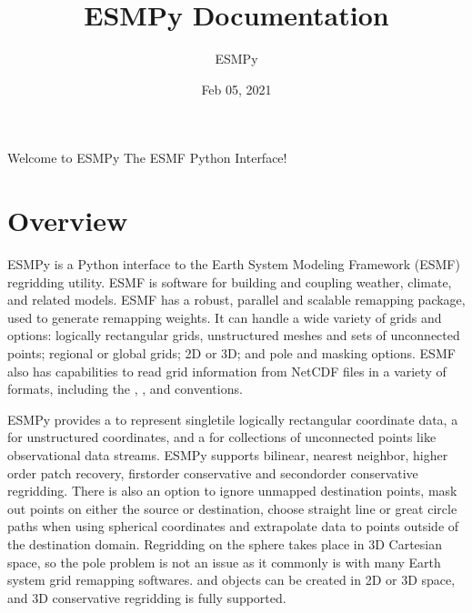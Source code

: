 \documentclass[letterpaper,10pt,english]{sphinxmanual}
\title{ESMPy Documentation}
\date{Feb 05, 2021}
\author{ESMPy}
\begin{document}
\pagestyle{empty}
\sphinxmaketitle
\pagestyle{plain}
\sphinxtableofcontents
\pagestyle{normal}
\label{\detokenize{index::doc}}


Welcome to ESMPy \sphinxhyphen{} The ESMF Python Interface!


\chapter{Overview}
\label{\detokenize{intro:module-ESMF}}\label{\detokenize{intro:overview}}\label{\detokenize{intro::doc}}
ESMPy is a Python interface to the Earth System Modeling Framework (ESMF) 
regridding utility. ESMF is software for
building and coupling weather, climate, and related models. ESMF has a robust,
parallel and scalable remapping package, used to generate remapping weights.
It can handle a wide variety of grids and options: logically rectangular grids,
unstructured meshes and sets of unconnected points; regional or global grids;
2D or 3D; and pole and masking options. ESMF also has capabilities to read grid
information from NetCDF files in a variety of formats, including the
,
,
and
conventions.

ESMPy provides a {\hyperref[\detokenize{grid:ESMF.api.grid.Grid}]{}} to represent single\sphinxhyphen{}tile logically
rectangular coordinate data, a {\hyperref[\detokenize{mesh:ESMF.api.mesh.Mesh}]{}} for unstructured 
coordinates, and a {\hyperref[\detokenize{locstream:ESMF.api.locstream.LocStream}]{}} for collections of
unconnected points like observational data streams.
ESMPy supports bilinear, nearest neighbor, higher order patch recovery, 
first\sphinxhyphen{}order conservative and second\sphinxhyphen{}order conservative regridding. There is 
also an option to ignore unmapped destination points, mask out points on either
the source or destination, choose straight line or great circle paths when using
spherical coordinates and extrapolate data to points outside of the destination
domain. Regridding on the sphere takes place in 3D Cartesian space, so the pole
problem is not an issue as it commonly is with many Earth system grid remapping
softwares. {\hyperref[\detokenize{grid:ESMF.api.grid.Grid}]{}} and {\hyperref[\detokenize{mesh:ESMF.api.mesh.Mesh}]{}} 
objects can be created in 2D or 3D space, and 3D conservative regridding is 
fully supported.
\end{document}
